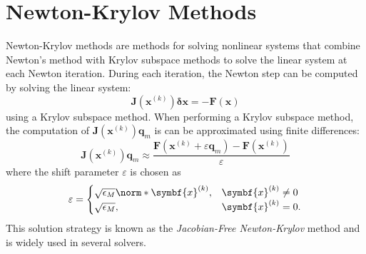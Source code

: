 \documentclass{article}
\begin{document}
\section{Newton-Krylov Methods}
Newton-Krylov methods are methods for solving nonlinear systems that
combine Newton's method with Krylov subspace methods to solve the
linear system at each Newton iteration. During each iteration, the
Newton step can be computed by solving the linear system:
\begin{equation*}
    \symbf{J}\left( \symbf{x}^{\left( k \right)} \right) \symbf{\delta} \symbf{x} = -\symbf{F}\left( \symbf{x} \right)
\end{equation*}
using a Krylov subspace method. When performing a Krylov subspace method,
the computation of \(\symbf{J}\left( \symbf{x}^{\left( k \right)} \right) \symbf{q}_m\)
is can be approximated using finite differences:
\begin{equation*}
    \symbf{J}\left( \symbf{x}^{\left( k \right)} \right) \symbf{q}_m \approx \frac{\symbf{F}\left( \symbf{x}^{\left( k \right)} + \varepsilon \symbf{q}_m \right) - \symbf{F}\left( \symbf{x}^{\left( k \right)} \right)}{\varepsilon}
\end{equation*}
where the shift parameter \(\varepsilon\) is chosen as
\begin{equation*}
    \varepsilon = \begin{cases}
        \sqrt{\epsilon_M} \norm*{\symbf{x}^{\left( k \right)}}, & \symbf{x}^{\left( k \right)} \neq 0 \\
        \sqrt{\epsilon_M}, & \symbf{x}^{\left( k \right)} = 0.
    \end{cases}
\end{equation*}
This solution strategy is known as the \textit{Jacobian-Free Newton-Krylov}
method and is widely used in several solvers.
\newpage
\end{document}
